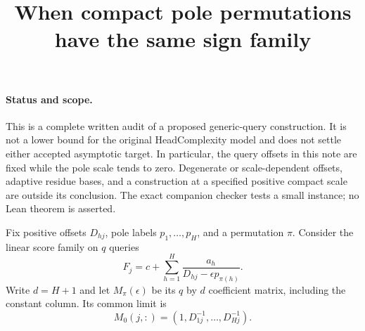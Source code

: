 \documentclass[11pt]{article}
\begin{document}
\title{When compact pole permutations have the same sign family}
\author{}\date{}\maketitle

\paragraph{Status and scope.}
This is a complete written audit of a proposed generic-query construction.
It is not a lower bound for the original HeadComplexity model and does not
settle either accepted asymptotic target. In particular, the query offsets
in this note are fixed while the pole scale tends to zero. Degenerate or
scale-dependent offsets, adaptive residue bases, and a construction at a
specified positive compact scale are outside its conclusion. The exact
companion checker tests a small instance; no Lean theorem is asserted.

Fix positive offsets $D_{hj}$, pole labels $p_1,\ldots,p_H$, and a
permutation $\pi$. Consider the linear score family on $q$ queries
\[
 F_j=c+\sum_{h=1}^H\frac{a_h}{D_{hj}-\epsilon p_{\pi(h)}}.
 \tag{1}
\]
Write $d=H+1$ and let $M_\pi(\epsilon)$ be its $q$ by $d$
coefficient matrix, including the constant column. Its common limit is
\[
 M_0(j,:)=(1,D_{1j}^{-1},\ldots,D_{Hj}^{-1}).
 \tag{2}
\]
\end{document}
